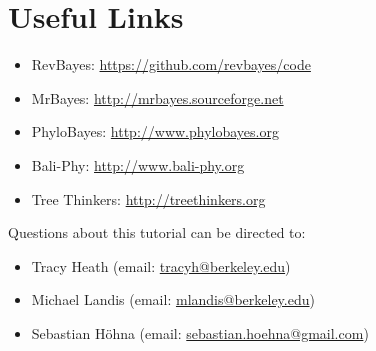 \bigskip
\section*{Useful Links}

\begin{itemize}
\item RevBayes: \href{https://github.com/revbayes/code}{https://github.com/revbayes/code} \\ \vspace{-7mm}
\item MrBayes: \href{http://mrbayes.sourceforge.net/}{http://mrbayes.sourceforge.net} \\ \vspace{-7mm}
\item PhyloBayes: \href{http://megasun.bch.umontreal.ca/People/lartillot/www/index.htm}{http://www.phylobayes.org} \\ \vspace{-7mm}
\item Bali-Phy: \href{http://www.bali-phy.org/}{http://www.bali-phy.org} \\ \vspace{-7mm}
\item Tree Thinkers: \href{http://treethinkers.org/}{http://treethinkers.org} \\ \vspace{-7mm}
\end{itemize}

Questions about this tutorial can be directed to: \\\vspace{-10mm}
\begin{itemize}
\item Tracy Heath (email: \href{mailto:tracyh@berkeley.edu}{tracyh@berkeley.edu}) \\\vspace{-8mm}
\item Michael Landis (email: \href{mailto:mlandis@berkeley.edu}{mlandis@berkeley.edu}) \\\vspace{-8mm} 
\item Sebastian H\"{o}hna (email: \href{mailto:sebastian.hoehna@gmail.com}{sebastian.hoehna@gmail.com})
\end{itemize}

